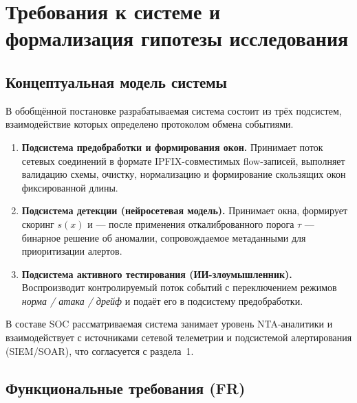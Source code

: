 
\section{Требования к системе и формализация гипотезы исследования}

\subsection{Концептуальная модель системы}

В обобщённой постановке разрабатываемая система состоит из трёх подсистем,
взаимодействие которых определено протоколом обмена событиями.

\begin{enumerate}
    \item \textbf{Подсистема предобработки и формирования окон.}
    Принимает поток сетевых соединений в формате IPFIX-совместимых
    flow-записей, выполняет валидацию схемы, очистку, нормализацию и
    формирование скользящих окон фиксированной длины.
    \item \textbf{Подсистема детекции (нейросетевая модель).}
    Принимает окна, формирует скоринг \(s(x)\) и --- после применения
    откалиброванного порога \(\tau\) --- бинарное решение об аномалии,
    сопровождаемое метаданными для приоритизации алертов.
    \item \textbf{Подсистема активного тестирования (ИИ-злоумышленник).}
    Воспроизводит контролируемый поток событий с переключением режимов
    \emph{норма / атака / дрейф} и подаёт его в подсистему предобработки.
\end{enumerate}

В составе SOC рассматриваемая система занимает уровень NTA-аналитики и
взаимодействует с источниками сетевой телеметрии и подсистемой алертирования
(SIEM/SOAR), что согласуется с  раздела~1.

\subsection{Функциональные требования (\textbf{FR})}

